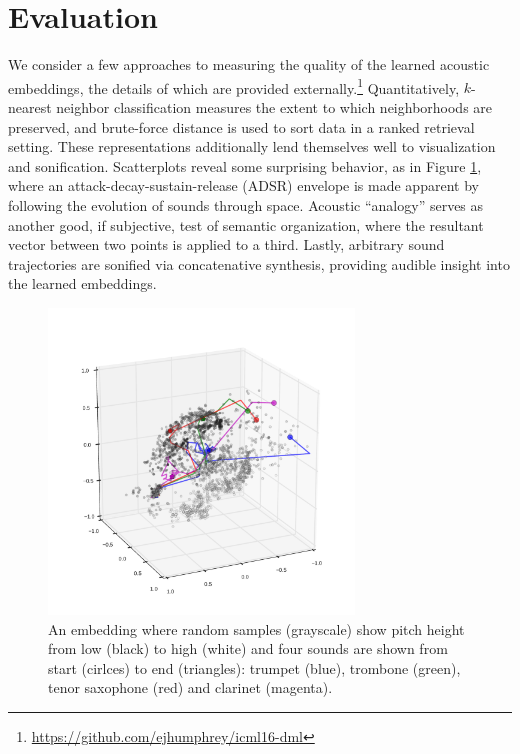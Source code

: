 \documentclass{article}
\begin{document}
\section{Evaluation}

We consider a few approaches to measuring the quality of the learned acoustic embeddings, the details of which are provided externally.\footnote{\url{https://github.com/ejhumphrey/icml16-dml}}
Quantitatively, $k$-nearest neighbor classification measures the extent to which neighborhoods are preserved, and brute-force distance is used to sort data in a ranked retrieval setting.
These representations additionally lend themselves well to visualization and sonification.
Scatterplots reveal some surprising behavior, as in Figure \ref{fig:asdr}, where an attack-decay-sustain-release (ADSR) envelope is made apparent by following the evolution of sounds through space.
Acoustic ``analogy'' serves as another good, if subjective, test of semantic organization, where the resultant vector between two points is applied to a third.
Lastly, arbitrary sound trajectories are sonified via concatenative synthesis, providing audible insight into the learned embeddings.



\begin{figure}[!t]
\vskip -0.35in
\begin{center}
\centerline{\includegraphics[width=3.2in]{inst-pitch-d2_adsr.pdf}}
\vskip -0.2in
\caption{An embedding where random samples (grayscale) show pitch height from low (black) to high (white) and four sounds are shown from start (cirlces) to end (triangles): trumpet (blue), trombone (green), tenor saxophone (red) and clarinet (magenta).}
\label{fig:asdr}
\end{center}
\vskip -0.25in
\end{figure}
\end{document}
